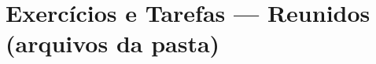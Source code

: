 \documentclass[11pt,a4paper]{article}
\begin{document}
\section{Exercícios e Tarefas — Reunidos (arquivos da pasta)}

\end{document}
